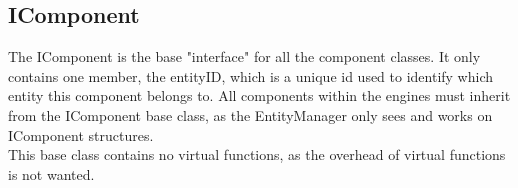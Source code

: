 \subsection{IComponent}

The IComponent is the base "interface" for all the component classes. 
It only contains one member, the entityID, which is a unique id used to identify which entity this component belongs to.
All components within the engines must inherit from the IComponent base class, as the EntityManager only sees and works on IComponent structures.\\
This base class contains no virtual functions, as the overhead of virtual functions is not wanted.

